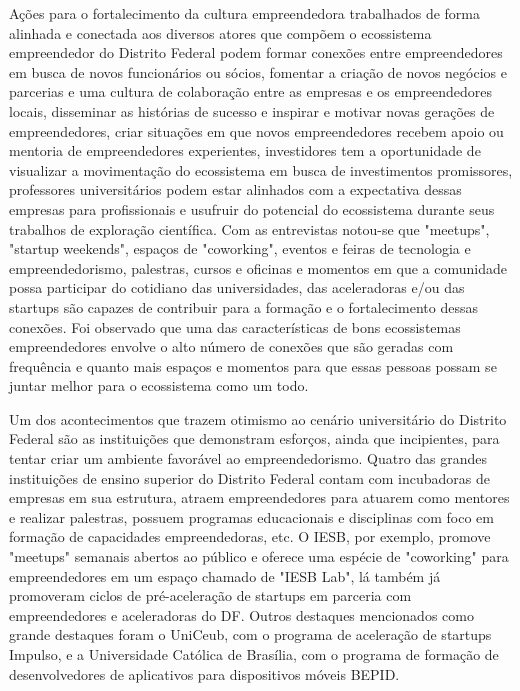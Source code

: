 Ações para o fortalecimento da cultura empreendedora trabalhados de forma alinhada e conectada aos diversos atores que compõem o ecossistema empreendedor do Distrito Federal podem formar conexões entre empreendedores em busca de novos funcionários ou sócios, fomentar a criação de novos negócios e parcerias e uma cultura de colaboração entre as empresas e os empreendedores locais, disseminar as histórias de sucesso e inspirar e motivar novas gerações de empreendedores, criar situações em que novos empreendedores recebem apoio ou mentoria de empreendedores experientes, investidores tem a oportunidade de visualizar a movimentação do ecossistema em busca de investimentos promissores, professores universitários podem estar alinhados com a expectativa dessas empresas para profissionais e usufruir do potencial do ecossistema durante seus trabalhos de exploração científica. Com as entrevistas notou-se que "meetups", "startup weekends", espaços de "coworking", eventos e feiras de tecnologia e empreendedorismo, palestras, cursos e oficinas e momentos em que a comunidade possa participar do cotidiano das universidades, das aceleradoras e/ou das startups são capazes de contribuir para a formação e o fortalecimento dessas conexões. Foi observado que uma das características de bons ecossistemas empreendedores envolve o alto número de conexões que são geradas com frequência e quanto mais espaços e momentos para que essas pessoas possam se juntar melhor para o ecossistema como um todo.

Um dos acontecimentos que trazem otimismo ao cenário universitário do Distrito Federal são as instituições que demonstram esforços, ainda que incipientes, para tentar criar um ambiente favorável ao empreendedorismo. Quatro das grandes instituições de ensino superior do Distrito Federal contam com incubadoras de empresas em sua estrutura, atraem empreendedores para atuarem como mentores e realizar palestras, possuem programas educacionais e disciplinas com foco em formação de capacidades empreendedoras, etc. O IESB, por exemplo, promove "meetups" semanais abertos ao público e oferece uma espécie de "coworking" para empreendedores em um espaço chamado de "IESB Lab", lá também já promoveram ciclos de pré-aceleração de startups em parceria com empreendedores e aceleradoras do DF. Outros destaques mencionados como grande destaques foram o UniCeub, com o programa de aceleração de startups Impulso, e a Universidade Católica de Brasília, com o programa de formação de desenvolvedores de aplicativos para dispositivos móveis BEPID.

